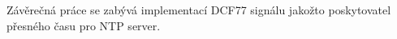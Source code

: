 Závěrečná práce se zabývá implementací DCF77 signálu jakožto poskytovatel přesného času
pro NTP server.

